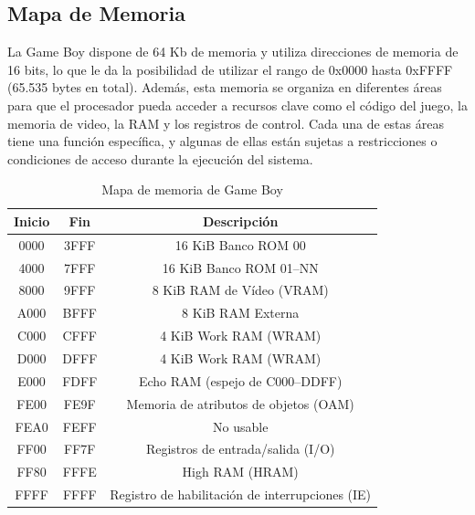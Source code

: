
\subsection{Mapa de Memoria}

La Game Boy dispone de 64 Kb de memoria y utiliza direcciones de memoria de 16 bits, lo que le da la posibilidad de utilizar el rango de 0x0000 hasta 0xFFFF (65.535 bytes en total). Además, esta memoria se organiza en diferentes áreas para que el procesador pueda acceder a recursos clave como el código del juego, la memoria de video, la RAM y los registros de control. Cada una de estas áreas tiene una función específica, y algunas de ellas están sujetas a restricciones o condiciones de acceso durante la ejecución del sistema.

\begin{table}[h]
\centering
\begin{tabular}{|c|c|c|}
\hline
\textbf{Inicio} & \textbf{Fin} & \textbf{Descripción} \\ \hline
0000 & 3FFF & 16 KiB Banco ROM 00 \\ \hline
4000 & 7FFF & 16 KiB Banco ROM 01–NN \\ \hline
8000 & 9FFF & 8 KiB RAM de Vídeo (VRAM) \\ \hline
A000 & BFFF & 8 KiB RAM Externa \\ \hline
C000 & CFFF & 4 KiB Work RAM (WRAM) \\ \hline
D000 & DFFF & 4 KiB Work RAM (WRAM) \\ \hline
E000 & FDFF & Echo RAM (espejo de C000–DDFF) \\ \hline
FE00 & FE9F & Memoria de atributos de objetos (OAM) \\ \hline
FEA0 & FEFF & No usable \\ \hline
FF00 & FF7F & Registros de entrada/salida (I/O) \\ \hline
FF80 & FFFE & High RAM (HRAM) \\ \hline
FFFF & FFFF & Registro de habilitación de interrupciones (IE) \\ \hline
\end{tabular}
\caption{Mapa de memoria de Game Boy}
\end{table}

